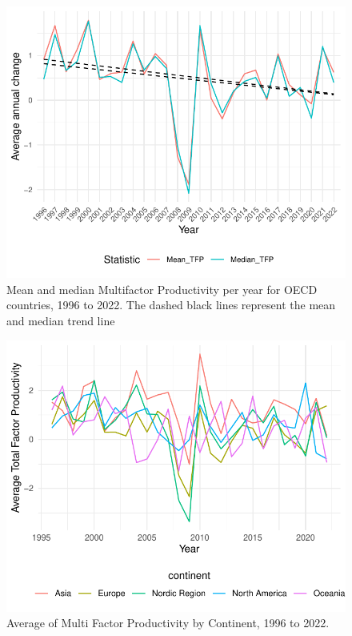 \documentclass[preprint, 1p,
authoryear]{elsarticle} %
\begin{document}
\begin{figure}

{\centering \includegraphics[width=0.8\linewidth]{Document_files/figure-latex/fig4-1} 

}

\caption{\label{fig5}Mean and median Multifactor Productivity per year for OECD countries, 1996 to 2022. The dashed black lines represent the mean and median trend line}\label{fig:fig4}
\end{figure}

\begin{figure}

{\centering \includegraphics[width=0.8\linewidth]{Document_files/figure-latex/fig5-1} 

}

\caption{\label{fig4}Average of Multi Factor Productivity by Continent, 1996 to 2022.}\label{fig:fig5}
\end{figure}
\end{document}
